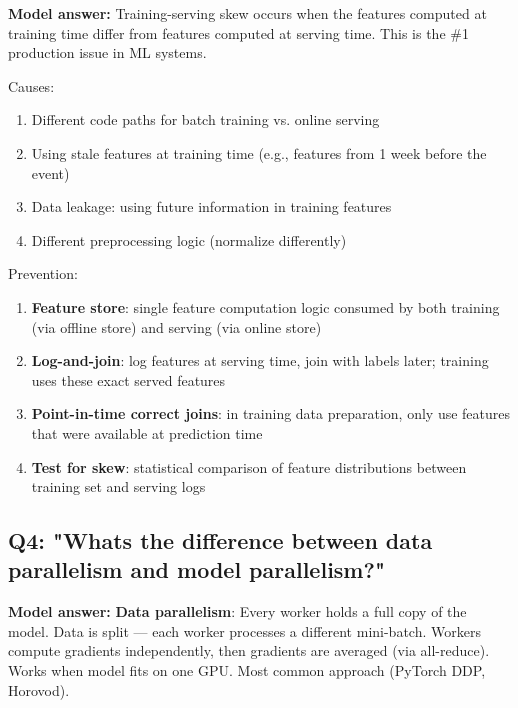 \documentclass[11pt]{article}
\providecommand{\tightlist}{\setlength{\itemsep}{1pt}\setlength{\parskip}{0pt}}
\begin{document}
\textbf{Model answer:}
Training-serving skew occurs when the features computed at training time differ from features computed at serving time. This is the \#1 production issue in ML systems.

Causes:

\begin{enumerate}
\def\labelenumi{\arabic{enumi}.}
\tightlist
\item
  Different code paths for batch training vs. online serving
\item
  Using stale features at training time (e.g., features from 1 week before the event)
\item
  Data leakage: using future information in training features
\item
  Different preprocessing logic (normalize differently)
\end{enumerate}

Prevention:

\begin{enumerate}
\def\labelenumi{\arabic{enumi}.}
\tightlist
\item
  \textbf{Feature store}: single feature computation logic consumed by both training (via offline store) and serving (via online store)
\item
  \textbf{Log-and-join}: log features at serving time, join with labels later; training uses these exact served features
\item
  \textbf{Point-in-time correct joins}: in training data preparation, only use features that were available at prediction time
\item
  \textbf{Test for skew}: statistical comparison of feature distributions between training set and serving logs
\end{enumerate}

\subsection{Q4: "What\textquotesingle s the difference between data parallelism and model parallelism?"}\label{q4-whats-the-difference-between-data-parallelism-and-model-parallelism}

\textbf{Model answer:}
\textbf{Data parallelism}: Every worker holds a full copy of the model. Data is split --- each worker processes a different mini-batch. Workers compute gradients independently, then gradients are averaged (via all-reduce). Works when model fits on one GPU. Most common approach (PyTorch DDP, Horovod).
\end{document}
